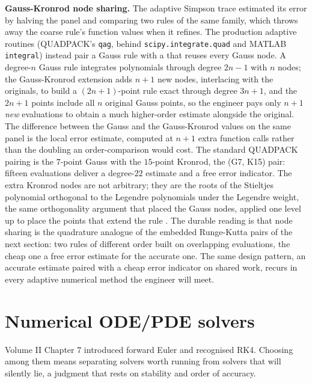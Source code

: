 \begin{mastery}
\textbf{Gauss-Kronrod node sharing.} The adaptive Simpson trace estimated
its error by halving the panel and comparing two rules of the same family,
which throws away the coarse rule's function values when it refines. The
production adaptive routines (QUADPACK's \texttt{qag}, behind
\texttt{scipy.integrate.quad} and MATLAB \texttt{integral}) instead pair a
Gauss rule with a  that reuses every Gauss node.
A degree-$n$ Gauss rule integrates polynomials through degree $2n - 1$ with
$n$ nodes; the Gauss-Kronrod extension adds $n + 1$ new nodes, interlacing
with the originals, to build a $(2n + 1)$-point rule exact through degree
$3n + 1$, and the $2n + 1$ points include all $n$ original Gauss points, so
the engineer pays only $n + 1$ \emph{new} evaluations to obtain a much
higher-order estimate alongside the original. The difference between the
Gauss and the Gauss-Kronrod values on the same panel is the local error
estimate, computed at $n + 1$ extra function calls rather than the doubling
an order-comparison would cost. The standard QUADPACK pairing is the
$7$-point Gauss with the $15$-point Kronrod, the (G7, K15) pair: fifteen
evaluations deliver a degree-$22$ estimate and a free error indicator. The
extra Kronrod nodes are not arbitrary; they are the roots of the Stieltjes
polynomial orthogonal to the Legendre polynomials under the Legendre weight,
the same orthogonality argument that placed the Gauss nodes, applied one
level up to place the points that extend the rule
\cite[ch.~3]{text:trefethen-bau1997}. The durable reading is that node
sharing is the quadrature analogue of the embedded Runge-Kutta pairs of the
next section: two rules of different order built on overlapping evaluations,
the cheap one a free error estimate for the accurate one. The same
design pattern, an accurate estimate paired with a cheap error indicator on
shared work, recurs in every adaptive numerical method the engineer will
meet.
\end{mastery}

\section{Numerical ODE/PDE solvers}

Volume II Chapter 7 introduced forward Euler and recognised RK4.
Choosing among them means separating solvers worth running from
solvers that will silently lie, a judgment that rests on stability and
order of accuracy.

